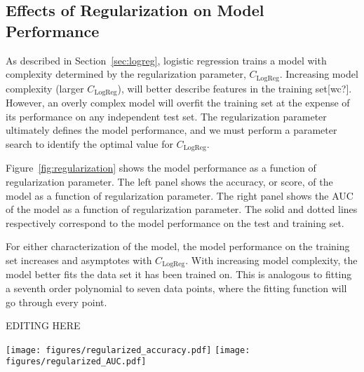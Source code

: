 \documentclass{emulateapj}
\begin{document}
\subsection{Effects of Regularization on Model Performance}\label{sec:regularizedfit}

As described in Section~\ref{sec:logreg}, logistic regression trains a
model with complexity determined by the regularization parameter,
$C_\text{LogReg}$.  Increasing model complexity (larger
$C_\text{LogReg}$), will better describe features in the training
set[wc?].  However, an overly complex model will overfit the training
set at the expense of its performance on any independent test set.
The regularization parameter ultimately defines the model performance,
and we must perform a parameter search to identify the optimal value
for $C_\text{LogReg}$.

Figure~\ref{fig:regularization} shows the model performance as a
function of regularization parameter.  The left panel shows the
accuracy, or score, of the model as a function of regularization
parameter.  The right panel shows the AUC of the model as a function
of regularization parameter.  The solid and dotted lines respectively
correspond to the model performance on the test and training set.

For either characterization of the model, the model performance on the
training set increases and asymptotes with $C_\text{LogReg}$.  With
increasing model complexity, the model better fits the data set it has
been trained on.  This is analogous to fitting a seventh order
polynomial to seven data points, where the fitting function will go
through every point.  

EDITING HERE


\begin{figure*}[t]\label{fig:regularization}
\begin{center}
\texttt{[image: figures/regularized\_accuracy.pdf]}\hspace{-20pt}
\texttt{[image: figures/regularized\_AUC.pdf]}
\caption{Left: Accuracy of the model with varying regularization.
  Each color corresponds to a model trained for features extracted
  with a different set of HOG parameters.  The dotted (solid) lines
  show the performance of the model on the training (test) set.
  Right: AUC of the model with varying regularization.  Linestyles and
  colors are similar to those in the left panel.  AUC is a better
  characterization of model performance, since the accuracy is
  determined for fixed classification threshold [wc?], but peak model
  performance can occur at a different classification threshold.}
\end{center}
\end{figure*}
\end{document}
